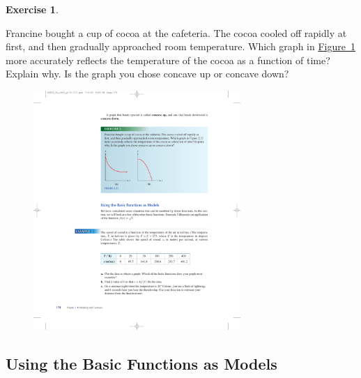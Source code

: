 \documentclass[10pt,]{book}
\theoremstyle{plain}
\theoremstyle{definition}
\newtheorem{exercise}[theorem]{Exercise}
\theoremstyle{definition}
\numberwithin{equation}{section}
\begin{document}
\begin{exercise}\label{exercise-concavity}

    Francine bought a cup of cocoa at the cafeteria. The cocoa cooled off rapidly at first, and then gradually approached room temperature. Which graph in \hyperref[fig-concavity2]{Figure~\ref{fig-concavity2}} more accurately reflects the temperature of the cocoa as a function of time? Explain why. Is the graph you chose concave up or concave down?
    \leavevmode%
\begin{figure}
\centering
\includegraphics[width=0.70\textwidth,]{images/fig-concavity2.pdf}\caption{\label{fig-concavity2}}
\end{figure}
\end{exercise}
\typeout{************************************************}
\typeout{************************************************}
\subsection[Using the Basic Functions as Models]{Using the Basic Functions as Models}\label{subsection-46}
\end{document}
